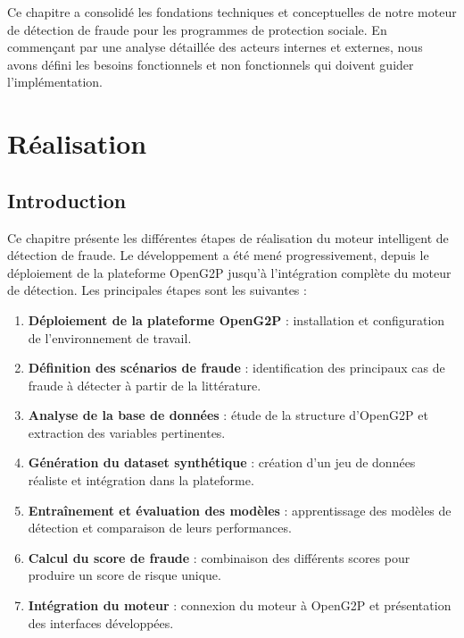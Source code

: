 \documentclass[a4paper, oneside, 12pt]{book}
\begin{document}
\hspace{0.5cm}Ce chapitre a consolidé les fondations techniques et conceptuelles de notre moteur de détection de fraude pour les programmes de protection sociale. En commençant par une analyse détaillée des acteurs internes et externes, nous avons défini les besoins fonctionnels et non fonctionnels qui doivent guider l'implémentation.




\chapter{Réalisation}

\section*{Introduction}

\hspace{0.5cm}Ce chapitre présente les différentes étapes de réalisation du moteur intelligent de détection de fraude. Le développement a été mené progressivement, depuis le déploiement de la plateforme OpenG2P jusqu'à l'intégration complète du moteur de détection. Les principales étapes sont les suivantes :

\begin{enumerate}
    \item \textbf{Déploiement de la plateforme OpenG2P} : installation et configuration de l'environnement de travail.
    \item \textbf{Définition des scénarios de fraude} : identification des principaux cas de fraude à détecter à partir de la littérature.
    \item \textbf{Analyse de la base de données} : étude de la structure d'OpenG2P et extraction des variables pertinentes.
    \item \textbf{Génération du dataset synthétique} : création d'un jeu de données réaliste et intégration dans la plateforme. 
    \item \textbf{Entraînement et évaluation des modèles} : apprentissage des modèles de détection et comparaison de leurs performances.
    \item \textbf{Calcul du score de fraude} : combinaison des différents scores pour produire un score de risque unique.
    \item \textbf{Intégration du moteur} : connexion du moteur à OpenG2P et présentation des interfaces développées.
\end{enumerate}
\end{document}
